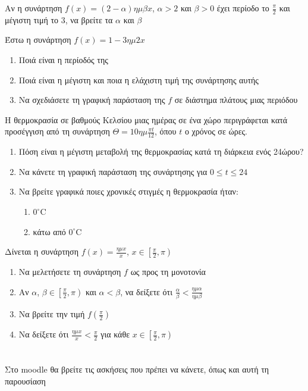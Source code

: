 \documentclass{../presentation}
\begin{document}
\begin{askisi}
  Αν η συνάρτηση $f(x)=(2-α)ημβx$, $α>2$ και $β>0$ έχει περίοδο το $\frac{π}{2}$ και μέγιστη τιμή το $3$, να βρείτε τα $α$ και $β$
\end{askisi}

\begin{askisi}
  Έστω η συνάρτηση $f(x)=1-3ημ2x$
  \begin{enumerate}
    \item<1-> Ποιά είναι η περίοδός της
    \item<2-> Ποιά είναι η μέγιστη και ποια η ελάχιστη τιμή της συνάρτησης αυτής
    \item<3-> Να σχεδιάσετε τη γραφική παράσταση της $f$ σε διάστημα πλάτους μιας περιόδου
  \end{enumerate}
\end{askisi}

\begin{askisi}
  Η θερμοκρασία σε βαθμούς Κελσίου μιας ημέρας σε ένα χώρο περιγράφεται κατά προσέγγιση από τη συνάρτηση $Θ=10ημ\frac{πt}{12}$, όπου $t$ ο χρόνος σε ώρες.
  \begin{enumerate}
    \item<1-> Πόση είναι η μέγιστη μεταβολή της θερμοκρασίας κατά τη διάρκεια ενός 24ώρου?
    \item<2-> Να κάνετε τη γραφική παράσταση της συνάρτησης για $0\le t \le 24$
    \item<3-> Να βρείτε γραφικά ποιες χρονικές στιγμές η θερμοκρασία ήταν:
          \begin{enumerate}
            \item<3-> $0^{\circ}$C
            \item<4-> κάτω από $0^{\circ}$C
          \end{enumerate}
  \end{enumerate}
\end{askisi}

\begin{askisi}
  Δίνεται η συνάρτηση $f(x)=\frac{ημx}{x}$, $x\in\left[ \frac{π}{2},π \right) $
  \begin{enumerate}
    \item<1-> Να μελετήσετε τη συνάρτηση $f$ ως προς τη μονοτονία
    \item<2-> Αν $α$, $β\in\left[ \frac{π}{2},π \right) $ και $α<β$, να δείξετε ότι $\frac{α}{β}<\frac{ημα}{ημβ}$
    \item<3-> Να βρείτε την τιμή $f(\frac{π}{2})$
    \item<4-> Να δείξετε ότι $\frac{ημx}{x}<\frac{π}{2}$ για κάθε $x\in\left[ \frac{π}{2},π \right) $
  \end{enumerate}
\end{askisi}

\section{}
\begin{frame}
  Στο moodle θα βρείτε τις ασκήσεις που πρέπει να κάνετε, όπως και αυτή τη παρουσίαση
\end{frame}

\end{document}
